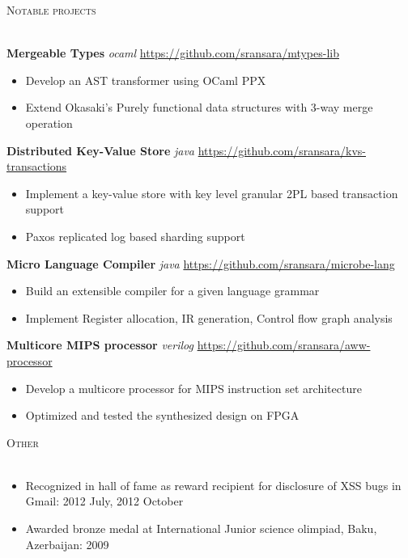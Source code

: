 \documentclass[a4paper]{article}
\newcommand{\header} [1] {
    {\hspace*{-18pt}\vspace*{6pt} \textsc{#1}
    \vspace*{-14pt} \\ \hspace*{-18pt} \hrulefill{} \\
    \vspace{1mm}}
}
\begin{document}
\header{Notable projects}
{\textbf{Mergeable Types}} {\sl ocaml\/} \hfill \url{https://github.com/sransara/mtypes-lib}
\begin{itemize}[label=$\square$]
	\item Develop an AST transformer using OCaml PPX
	\item Extend Okasaki's Purely functional data structures with 3-way merge operation
\end{itemize}
{\textbf{Distributed Key-Value Store}} {\sl java\/} \hfill \url{https://github.com/sransara/kvs-transactions}
\begin{itemize}[label=$\square$]
	\item Implement a key-value store with key level granular 2PL based transaction support
	\item Paxos replicated log based sharding support
\end{itemize}
{\textbf{Micro Language Compiler}} {\sl java\/} \hfill \url{https://github.com/sransara/microbe-lang}
\begin{itemize}[label=$\square$]
	\item Build an extensible compiler for a given language grammar
	\item Implement Register allocation, IR generation, Control flow graph analysis
\end{itemize}
{\textbf{Multicore MIPS processor}} {\sl verilog\/} \hfill \url{https://github.com/sransara/aww-processor}
\begin{itemize}[label=$\square$]
    \item Develop a multicore processor for MIPS instruction set architecture
    \item Optimized and tested the synthesized design on FPGA 
\end{itemize}

\header{Other}
\begin{itemize}[label=$\square$]
	\item Recognized in hall of fame as reward recipient for disclosure of XSS bugs in Gmail: 2012 July, 2012 October
	\item Awarded bronze medal at International Junior science olimpiad, Baku, Azerbaijan: 2009
\end{itemize}
\end{document}
